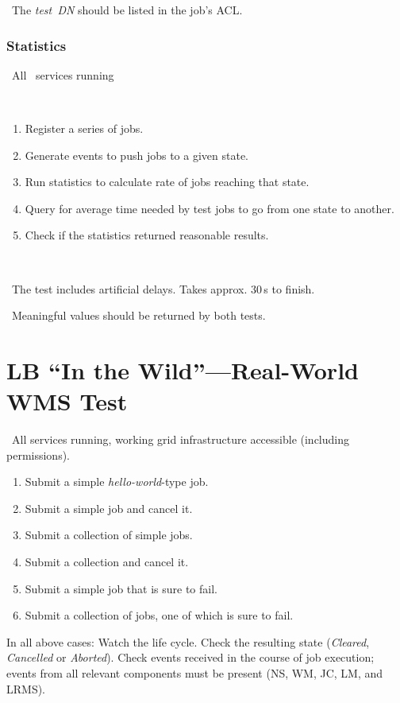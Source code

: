 \result\ The \emph{test~DN} should be listed in the job's ACL.

\subsubsection{Statistics}

\req\ All \LB\ services running

\what\
\begin{enumerate}
\item Register a series of jobs.
\item Generate events to push jobs to a given state.
\item Run statistics to calculate rate of jobs reaching that state. 
\item Query for average time needed by test jobs to go from one state to another.
\item Check if the statistics returned reasonable results. 
\end{enumerate}

\how\ 

\note\ The test includes artificial delays. Takes approx. 30\,s to finish.

\result\ Meaningful values should be returned by both tests. 



\section{LB ``In the Wild''---Real-World WMS Test}
\req\ All \LB services running, working grid infrastructure accessible (including permissions). 

\what
\begin{enumerate}
\item Submit a simple \emph{hello-world}-type job.
\item Submit a simple job and cancel it.
\item Submit a collection of simple jobs.
\item Submit a collection and cancel it. 
\item Submit a simple job that is sure to fail.
\item Submit a collection of jobs, one of which is sure to fail. 
\end{enumerate}

In all above cases: Watch the life cycle. Check the resulting state (\emph{Cleared}, \emph{Cancelled} or \emph{Aborted}). Check events received in the course of job execution; events from all relevant components must be present (NS, WM, JC, LM, and LRMS). 


